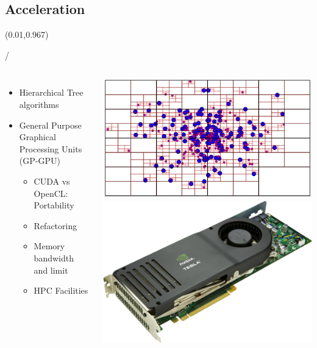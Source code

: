 \documentclass{beamer}
\makeatletter
\newcommand{\framenumber}{
\begin{textblock}{0}(0.01,0.967)
\begin{scriptsize}
{\color{gray}\insertframenumber/\inserttotalframenumber}
\end{scriptsize}
\end{textblock}
}
\makeatother
\begin{document}
\subsection{Acceleration}
\begin{frame}{}\framenumber
\begin{columns}
    \begin{itemize}
     \item Hierarchical Tree algorithms
     \item General Purpose Graphical Processing Units (GP-GPU)
        \begin{itemize}
        \item CUDA vs OpenCL: Portability
        \item Refactoring
        \item Memory bandwidth and limit
        \item HPC Facilities
        \end{itemize}
    \end{itemize}

    \includegraphics[width=\textwidth]{../figures/quadtree}\\
    \includegraphics[width=\textwidth]{figures/tesla}


\end{columns}
\end{frame}
\end{document}
